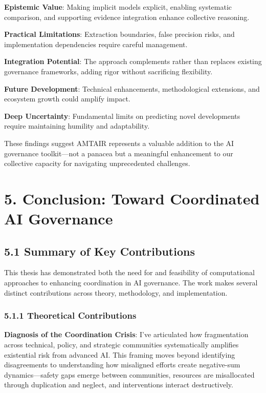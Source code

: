 \documentclass[
  11pt,
  letterpaper,
]{book}
\begin{document}
\textbf{Epistemic Value}: Making implicit models explicit, enabling
systematic comparison, and supporting evidence integration enhance
collective reasoning.

\textbf{Practical Limitations}: Extraction boundaries, false precision
risks, and implementation dependencies require careful management.

\textbf{Integration Potential}: The approach complements rather than
replaces existing governance frameworks, adding rigor without
sacrificing flexibility.

\textbf{Future Development}: Technical enhancements, methodological
extensions, and ecosystem growth could amplify impact.

\textbf{Deep Uncertainty}: Fundamental limits on predicting novel
developments require maintaining humility and adaptability.

These findings suggest AMTAIR represents a valuable addition to the AI
governance toolkit---not a panacea but a meaningful enhancement to our
collective capacity for navigating unprecedented challenges.


\chapter{5. Conclusion: Toward Coordinated AI
Governance}\label{sec-conclusion}

\section{5.1 Summary of Key Contributions}\label{sec-key-contributions}

This thesis has demonstrated both the need for and feasibility of
computational approaches to enhancing coordination in AI governance. The
work makes several distinct contributions across theory, methodology,
and implementation.

\subsection{5.1.1 Theoretical
Contributions}\label{sec-theoretical-contributions}

\textbf{Diagnosis of the Coordination Crisis}: I've articulated how
fragmentation across technical, policy, and strategic communities
systematically amplifies existential risk from advanced AI. This framing
moves beyond identifying disagreements to understanding how misaligned
efforts create negative-sum dynamics---safety gaps emerge between
communities, resources are misallocated through duplication and neglect,
and interventions interact destructively.
\end{document}
